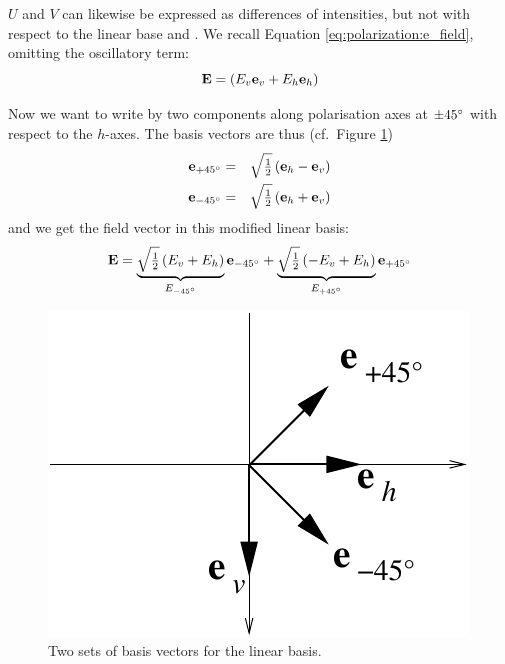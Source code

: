 $U$ and $V$ can likewise be expressed as differences of intensities, but not
with respect to the linear base \eVrt and \eHor. We recall Equation
\ref{eq:polarization:e_field}, omitting the oscillatory term:
\begin{equation}
  \label{eq:polarization:E_linbase}
  \mathbf{E}= \left(E_v \mathbf{e}_v +  E_h \mathbf{e}_h \right) 
\end{equation}

Now we want to write  by two components along polarisation axes at
$\pm 45^\circ$ with respect to the $h$-axes. The basis vectors are
thus (cf.\ Figure \ref{fig:polarization:e45})
\begin{eqnarray}
  \label{eq:polarization:e_p45}
  \mathbf{e}_{+45^\circ} &=& \sqrt{\textstyle\frac{1}{2}} \left( \mathbf{e}_h - \mathbf{e}_v \right) \\
  \label{eq:polarization:e_m45}
  \mathbf{e}_{-45^\circ} &=& \sqrt{\textstyle\frac{1}{2}} \left( \mathbf{e}_h + \mathbf{e}_v \right) 
\end{eqnarray}
and we get the field vector in this modified linear basis:
\begin{equation}
  \label{eq:polarization:E_lin45base}
  \mathbf{E} = \underbrace{
               \sqrt{\textstyle\frac{1}{2}}\left(E_v +  E_h \right)}_{E_{-45^\circ}} 
               \mathbf{e}_{-45^\circ} 
              + \underbrace{
               \sqrt{\textstyle\frac{1}{2}}\left( -E_v +  E_h \right)}_{E_{+45^\circ}} 
               \mathbf{e}_{+45^\circ} 
\end{equation}
%
\begin{figure}
 \begin{center}
  \begin{minipage}[c]{0.9\textwidth}
   \begin{center}
    \includegraphics*[width=0.4\hsize]{pol_e45}
   \end{center}
  \end{minipage}
  \begin{minipage}[c]{0.9\textwidth}
   \caption{Two sets of basis vectors for the linear basis.}
   \label{fig:polarization:e45}
  \end{minipage}
 \end{center}
\end{figure}   
